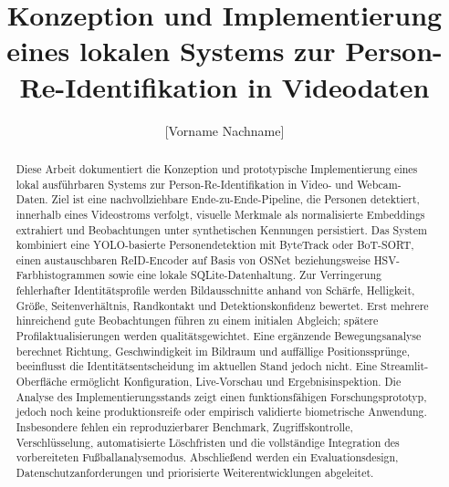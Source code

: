 \documentclass[runningheads]{llncs}
\newcommand{\todoentry}[1]{\textcolor{red!70!black}{[#1]}}
\begin{document}
\title{Konzeption und Implementierung eines lokalen Systems zur Person-Re-Identifikation in Videodaten}

\author{\todoentry{Vorname Nachname}}
\authorrunning{\todoentry{Nachname}}

\institute{\todoentry{Hochschule für angewandte Wissenschaften}\\
\todoentry{Fakultät / Masterstudiengang / Modul}\\
\email{\todoentry{hochschul-email@example.org}}}

\maketitle

\begin{abstract}
Diese Arbeit dokumentiert die Konzeption und prototypische Implementierung eines lokal ausführbaren Systems zur Person-Re-Identifikation in Video- und Webcam-Daten. Ziel ist eine nachvollziehbare Ende-zu-Ende-Pipeline, die Personen detektiert, innerhalb eines Videostroms verfolgt, visuelle Merkmale als normalisierte Embeddings extrahiert und Beobachtungen unter synthetischen Kennungen persistiert. Das System kombiniert eine YOLO-basierte Personendetektion mit ByteTrack oder BoT-SORT, einen austauschbaren ReID-Encoder auf Basis von OSNet beziehungsweise HSV-Farbhistogrammen sowie eine lokale SQLite-Datenhaltung. Zur Verringerung fehlerhafter Identitätsprofile werden Bildausschnitte anhand von Schärfe, Helligkeit, Größe, Seitenverhältnis, Randkontakt und Detektionskonfidenz bewertet. Erst mehrere hinreichend gute Beobachtungen führen zu einem initialen Abgleich; spätere Profilaktualisierungen werden qualitätsgewichtet. Eine ergänzende Bewegungsanalyse berechnet Richtung, Geschwindigkeit im Bildraum und auffällige Positionssprünge, beeinflusst die Identitätsentscheidung im aktuellen Stand jedoch nicht. Eine Streamlit-Oberfläche ermöglicht Konfiguration, Live-Vorschau und Ergebnisinspektion. Die Analyse des Implementierungsstands zeigt einen funktionsfähigen Forschungsprototyp, jedoch noch keine produktionsreife oder empirisch validierte biometrische Anwendung. Insbesondere fehlen ein reproduzierbarer Benchmark, Zugriffskontrolle, Verschlüsselung, automatisierte Löschfristen und die vollständige Integration des vorbereiteten Fußballanalysemodus. Abschließend werden ein Evaluationsdesign, Datenschutzanforderungen und priorisierte Weiterentwicklungen abgeleitet.

\end{abstract}
\end{document}
